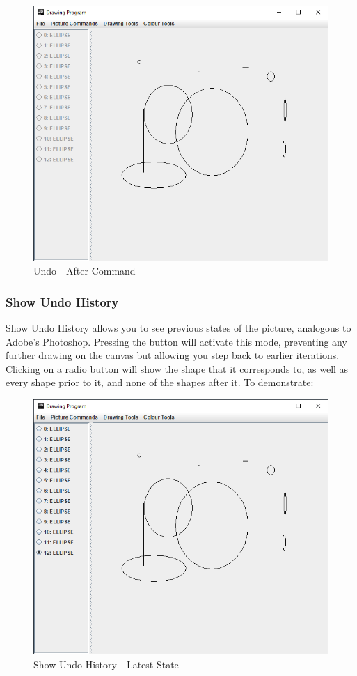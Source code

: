 \documentclass[12pt]{article} %
\begin{document}
\begin{figure}[H]
\caption{Undo - After Command}
\centering
\includegraphics[scale=0.75]{pictures/undoSecondWindow.PNG}
\end{figure}

\subsubsection{Show Undo History}
Show Undo History allows you to see previous states of the picture, analogous to Adobe's Photoshop. Pressing the button will activate this mode, preventing any further drawing on the canvas but allowing you step back to earlier iterations. Clicking on a radio button will show the shape that it corresponds to, as well as every shape prior to it, and none of the shapes after it. To demonstrate:

\begin{figure}[H]
\caption{Show Undo History - Latest State}
\centering
\includegraphics[scale=0.75]{pictures/showUndoFirstWindow.PNG}
\end{figure}
\end{document}

